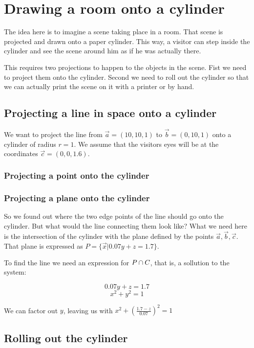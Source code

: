 
\section{Drawing a room onto a cylinder}


The idea here is to imagine a scene taking place in a room. That scene is projected and drawn onto a paper cylinder. This way, a visitor can step inside the cylinder and see the scene around him as if he was actually there. 

This requires two projections to happen to the objects in the scene. Fist we need to project them onto the cylinder. Second we need to roll out the cylinder so that we can actually print the scene on it with a printer or by hand. 

\subsection{Projecting a line in space onto a cylinder}

We want to project the line from $\vec{a} = (10, 10, 1)$ to $\vec{b} = (0, 10, 1)$ onto a cylinder of radius $r=1$. We assume that the visitors eyes will be at the coordinates $\vec{c} = (0, 0, 1.6)$.

\subsubsection{Projecting a point onto the cylinder}

\subsubsection{Projecting a plane onto the cylinder}

So we found out where the two edge points of the line should go onto the cylinder. But what would the line connecting them look like? What we need here is the intersection of the cylinder with the plane  defined by the points $\vec{a}, \vec{b}, \vec{c}$. That plane is expressed as $P = \{ \vec{x} | 0.07y + z = 1.7 \}$.

To find the line we need an expression for $P \cap C$, that is, a sollution to the system: 

$$ 0.07 y + z = 1.7 $$
$$ x^2 + y^2 = 1 $$

We can factor out $y$, leaving us with $x^2 + (\frac{1.7 - z}{0.07})^2 = 1$

\subsection{Rolling out the cylinder}

